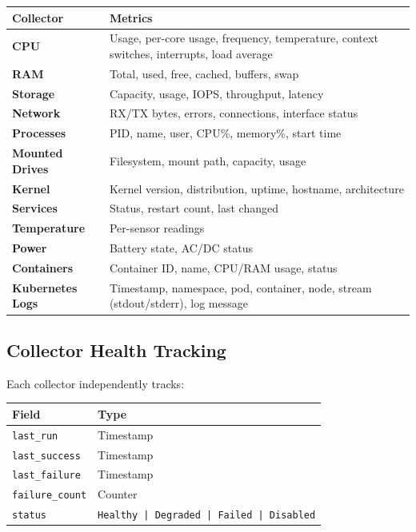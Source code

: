 \documentclass[12pt,a4paper]{article}
\begin{document}
\begin{center}
\begin{tabularx}{\textwidth}{lX}
\toprule
Collector & Metrics \\
\midrule
\textbf{CPU} & Usage, per-core usage, frequency, temperature, context switches, interrupts, load average \\
\textbf{RAM} & Total, used, free, cached, buffers, swap \\
\textbf{Storage} & Capacity, usage, IOPS, throughput, latency \\
\textbf{Network} & RX/TX bytes, errors, connections, interface status \\
\textbf{Processes} & PID, name, user, CPU\%, memory\%, start time \\
\textbf{Mounted Drives} & Filesystem, mount path, capacity, usage \\
\textbf{Kernel} & Kernel version, distribution, uptime, hostname, architecture \\
\textbf{Services} & Status, restart count, last changed \\
\textbf{Temperature} & Per-sensor readings \\
\textbf{Power} & Battery state, AC/DC status \\
\textbf{Containers} & Container ID, name, CPU/RAM usage, status \\
\textbf{Kubernetes Logs} & Timestamp, namespace, pod, container, node, stream (stdout/stderr), log message \\
\bottomrule
\end{tabularx}
\end{center}

\subsection{Collector Health Tracking}

Each collector independently tracks:

\begin{center}
\begin{tabular}{ll}
\toprule
Field & Type \\
\midrule
\texttt{last\_run} & Timestamp \\
\texttt{last\_success} & Timestamp \\
\texttt{last\_failure} & Timestamp \\
\texttt{failure\_count} & Counter \\
\texttt{status} & \texttt{Healthy | Degraded | Failed | Disabled} \\
\bottomrule
\end{tabular}
\end{center}
\end{document}
